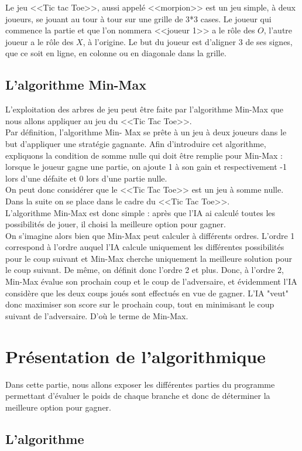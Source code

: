 \documentclass{article}
\begin{document}
Le jeu <<Tic tac Toe>>, aussi appelé <<morpion>> est un jeu simple, à deux joueurs, se jouant au tour à tour sur une grille de 3*3 cases.
Le joueur qui commence la partie et que l'on nommera <<joueur 1>> a le rôle des $O$, l'autre joueur a le rôle des $X$, à l'origine.
Le but du joueur est d'aligner 3 de ses signes, que ce soit en ligne, en colonne ou en diagonale dans la grille.


\subsection{L'algorithme Min-Max}

L'exploitation des arbres de jeu peut être faite par l'algorithme Min-Max 
que nous allons appliquer au jeu du <<Tic Tac Toe>>. \\

Par définition, l'algorithme Min-
Max se prête à un jeu à deux joueurs dans le but d'appliquer une stratégie
gagnante. 
Afin d'introduire cet algorithme, expliquons la condition de somme nulle qui
doit être remplie pour Min-Max : 
lorsque le joueur gagne une partie, on ajoute 1 à son gain et respectivement -1
lors 
d'une défaite et 0 lors d'une partie nulle. \\

On peut donc considérer que le <<Tic Tac Toe>> est un jeu à somme nulle.
Dans la suite on se place dans le cadre du <<Tic Tac Toe>>. \\

L'algorithme Min-Max est donc simple : après que l'IA ai calculé toutes les
possibilités de jouer,
 il choisi la meilleure option pour gagner. \\

On s'imagine alors bien que Min-Max peut calculer à différents ordres. L'ordre 1
correspond à l'ordre auquel 
l'IA calcule uniquement les différentes possibilités pour le coup suivant et
Min-Max cherche uniquement 
la meilleure solution pour le coup suivant. De même, on définit donc l'ordre 2
et plus.
Donc, à l'ordre 2, Min-Max évalue son prochain coup et le coup de l'adversaire,
et évidemment 
l'IA considère que les deux coups joués sont effectués en vue de gagner. L'IA
"veut" donc 
maximiser son score sur le prochain coup, tout en minimisant le coup suivant de
l'adversaire.
D'où le terme de Min-Max.

\section{Présentation de l'algorithmique}

Dans cette partie, nous allons exposer les différentes parties du programme permettant d'évaluer le poids de chaque branche et donc de déterminer la meilleure option pour gagner.

\subsection{L'algorithme}
\end{document}
